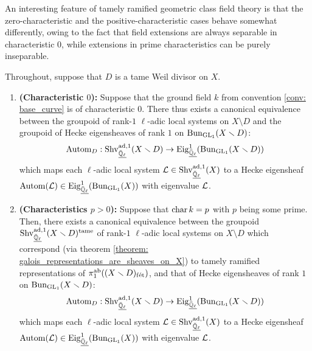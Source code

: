         An interesting feature of tamely ramified geometric class field theory is that the zero-characteristic and the positive-characteristic cases behave somewhat differently, owing to the fact that field extensions are always separable in characteristic $0$, while extensions in prime characteristics can be purely inseparable.
        \begin{theorem} \label{theorem: tamely_ramified_abelian_geometric_class_field_theory}
            Throughout, suppose that $D$ is a tame Weil divisor on $X$.
                \begin{enumerate}
                    \item \textbf{(Characteristic $0$):} Suppose that the ground field $k$ from convention \ref{conv: base_curve} is of characteristic $0$. There thus exists a canonical equivalence between the groupoid of rank-$1$ $\ell$-adic local systems on $X \setminus D$ and the groupoid of Hecke eigensheaves of rank $1$ on $\mathrm{Bun}_{\operatorname{GL}_1}(X \smallsetminus D)$:
                        $$\mathrm{Autom}_D: \mathrm{Shv}_{\underline{\bar{\mathbb{Q}}_{\ell}}}^{\mathrm{ad}, 1}(X \smallsetminus D) \to \mathrm{Eig}_{\underline{\bar{\mathbb{Q}}_{\ell}}}^1(\mathrm{Bun}_{\operatorname{GL}_1}(X \smallsetminus D))$$
                    which maps each $\ell$-adic local system $\mathcal{L} \in \mathrm{Shv}_{\underline{\bar{\mathbb{Q}}_{\ell}}}^{\mathrm{ad}, 1}(X)$ to a Hecke eigensheaf $\mathrm{Autom}(\mathcal{L}) \in \mathrm{Eig}_{\underline{\bar{\mathbb{Q}}_{\ell}}}^1(\mathrm{Bun}_{\operatorname{GL}_1}(X))$ with eigenvalue $\mathcal{L}$.
                    \item \textbf{(Characteristics $p > 0$):} Suppose that $\operatorname{char} k = p$ with $p$ being some prime. Then, there exists a canonical equivalence between the groupoid $\mathrm{Shv}_{\underline{\bar{\mathbb{Q}}_{\ell}}}^{\mathrm{ad}, 1}(X \smallsetminus D)^{\mathrm{tame}}$ of rank-$1$ $\ell$-adic local systems on $X \setminus D$ which correspond (via theorem \ref{theorem: galois_representations_are_sheaves_on_X}) to tamely ramified representations of $\pi_1^{\mathrm{ab}}((X \smallsetminus D)_{\mathrm{f\acute{e}t}})$, and that of Hecke eigensheaves of rank $1$ on $\mathrm{Bun}_{\operatorname{GL}_1}(X \smallsetminus D)$:
                        $$\mathrm{Autom}_D: \mathrm{Shv}_{\underline{\bar{\mathbb{Q}}_{\ell}}}^{\mathrm{ad}, 1}(X \smallsetminus D) \to \mathrm{Eig}_{\underline{\bar{\mathbb{Q}}_{\ell}}}^1(\mathrm{Bun}_{\operatorname{GL}_1}(X \smallsetminus D))$$
                    which maps each $\ell$-adic local system $\mathcal{L} \in \mathrm{Shv}_{\underline{\bar{\mathbb{Q}}_{\ell}}}^{\mathrm{ad}, 1}(X)$ to a Hecke eigensheaf $\mathrm{Autom}(\mathcal{L}) \in \mathrm{Eig}_{\underline{\bar{\mathbb{Q}}_{\ell}}}^1(\mathrm{Bun}_{\operatorname{GL}_1}(X))$ with eigenvalue $\mathcal{L}$.
                \end{enumerate}
        \end{theorem}
